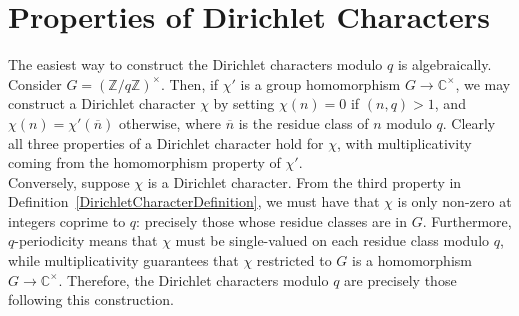 \section{Properties of Dirichlet Characters}
The easiest way to construct the Dirichlet characters modulo $q$ is algebraically. Consider $G = (\mathbb{Z}/q\mathbb{Z})^{\times}$. Then, if $\chi'$ is a group homomorphism $G \rightarrow \mathbb{C}^{\times}$, we may construct a Dirichlet character $\chi$ by setting $\chi(n)=0$ if $(n, q) > 1$, and $\chi(n) = \chi'(\overline{n})$ otherwise, where $\overline{n}$ is the residue class of $n$ modulo $q$. Clearly all three properties of a Dirichlet character hold for $\chi$, with multiplicativity coming from the homomorphism property of $\chi'$. \\

Conversely, suppose $\chi$ is a Dirichlet character. From the third property in Definition~\ref{DirichletCharacterDefinition}, we must have that $\chi$ is only non-zero at integers coprime to $q$: precisely those whose residue classes are in $G$. Furthermore, $q$-periodicity means that $\chi$ must be single-valued on each residue class modulo $q$, while multiplicativity guarantees that $\chi$ restricted to $G$ is a homomorphism $G \rightarrow \mathbb{C}^{\times}$. Therefore, the Dirichlet characters modulo $q$ are precisely those following this construction. \\

